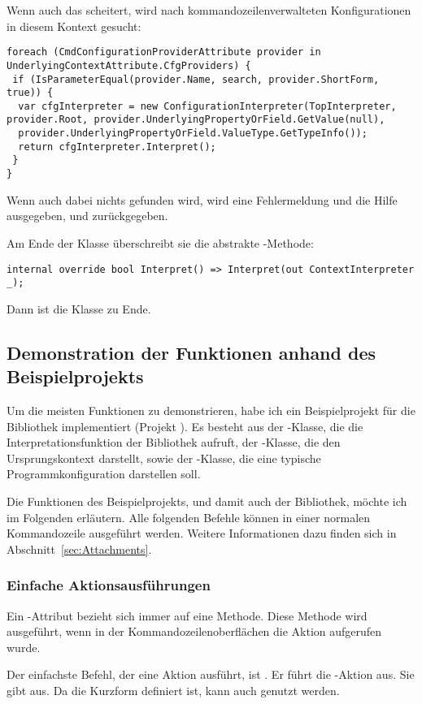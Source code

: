 Wenn auch das scheitert, wird nach kommandozeilenverwalteten Konfigurationen in diesem Kontext gesucht:
\begin{lstlisting}[title=""]
foreach (CmdConfigurationProviderAttribute provider in UnderlyingContextAttribute.CfgProviders) {
 if (IsParameterEqual(provider.Name, search, provider.ShortForm, true)) {
  var cfgInterpreter = new ConfigurationInterpreter(TopInterpreter, provider.Root, provider.UnderlyingPropertyOrField.GetValue(null),
  provider.UnderlyingPropertyOrField.ValueType.GetTypeInfo());
  return cfgInterpreter.Interpret();
 }
}
\end{lstlisting}
Wenn auch dabei nichts gefunden wird, wird eine Fehlermeldung und die Hilfe ausgegeben, und  zurückgegeben.

Am Ende der Klasse überschreibt sie die abstrakte -Methode:
\begin{lstlisting}[title=""]
 internal override bool Interpret() => Interpret(out ContextInterpreter _);
\end{lstlisting}
Dann ist die Klasse zu Ende.
\subsection{Demonstration der Funktionen anhand des Beispielprojekts}\label{subsec:demonstration}
Um die meisten Funktionen zu demonstrieren, habe ich ein Beispielprojekt für die Bibliothek implementiert (Projekt ).
Es besteht aus der -Klasse, die die Interpretationsfunktion der Bibliothek aufruft, der -Klasse, 
die den Ursprungskontext darstellt, sowie der -Klasse, die eine typische Programmkonfiguration darstellen soll.

Die Funktionen des Beispielprojekts, und damit auch der Bibliothek, möchte ich im Folgenden erläutern.
Alle folgenden Befehle können in einer normalen Kommandozeile ausgeführt werden.
Weitere Informationen dazu finden sich in Abschnitt~\ref{sec:Attachments}.%
\subsubsection{Einfache Aktionsausführungen}
Ein -Attribut bezieht sich immer auf eine Methode.
Diese Methode wird ausgeführt, wenn in der Kommandozeilenoberflächen die Aktion aufgerufen wurde.

Der einfachste Befehl, der eine Aktion ausführt, ist .
Er führt die -Aktion aus.
Sie gibt  aus.
Da die Kurzform  definiert ist, kann auch  genutzt werden.

